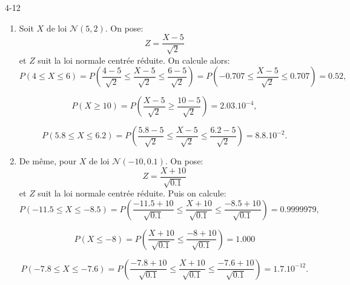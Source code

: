 \begin{corrige}{4-12}

\begin{enumerate}

\item Soit $X$ de loi $\mathcal{N}(5,2)$. On pose: $$Z = \frac{X-5}{\sqrt{2}}$$ et $Z$ suit la loi normale centr\'ee r\'eduite. On calcule alors:
$$
P(4 \leq X \leq 6) = P ( \frac{4-5}{\sqrt{2}} \leq \frac{X-5}{\sqrt{2}} \leq \frac{6-5}{\sqrt{2}}) = 
P ( -0.707 \leq \frac{X-5}{\sqrt{2}} \leq 0.707 ) = 0.52,
$$

$$
P ( X  \geq 10 ) = P ( \frac{X-5}{\sqrt{2}} \geq \frac{10-5}{\sqrt{2}} ) = 2.03.10^{-4},
$$

$$
P(5.8 \leq X \leq 6.2) = P ( \frac{5.8-5}{\sqrt{2}} \leq \frac{X-5}{\sqrt{2}} \leq \frac{6.2-5}{\sqrt{2}}) = 8.8.10^{-2}.
$$


\item De même, pour $X$ de loi $\mathcal{N}(-10,0.1)$. On pose: $$Z = \frac{X+10}{\sqrt{0.1}}$$ et $Z$ suit la loi normale centr\'ee r\'eduite. Puis on calcule:
$$
P(-11.5 \leq X \leq -8.5) = P ( \frac{-11.5+10}{\sqrt{0.1}} \leq \frac{X+10}{\sqrt{0.1}} \leq \frac{-8.5+10}{\sqrt{0.1}}) = 0.9999979,
$$

$$
P ( X  \leq -8 ) = P ( \frac{X+10}{\sqrt{0.1}} \leq \frac{-8+10}{\sqrt{0.1}} ) = 1.000
$$

$$
P(-7.8 \leq X \leq -7.6) = P ( \frac{-7.8+10}{\sqrt{0.1}} \leq \frac{X+10}{\sqrt{0.1}} \leq \frac{-7.6+10}{\sqrt{0.1}}) = 1.7.10^{-12}.
$$


\end{enumerate}

\end{corrige}
